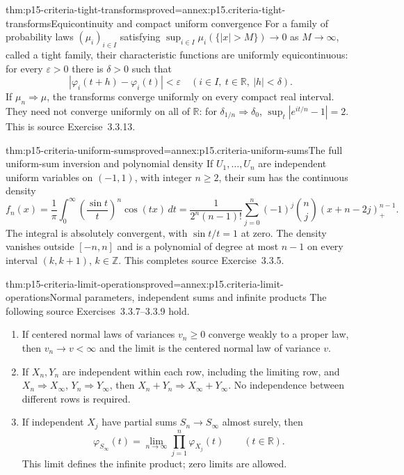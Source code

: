 \begin{hbtheorem}{thm:p15-criteria-tight-transforms}{proved=annex:p15.criteria-tight-transforms}{Equicontinuity and compact uniform convergence}
For a family of probability laws \((\mu_i)_{i\in I}\) satisfying
\(\sup_{i\in I}\mu_i(\{|x|>M\})\to0\) as \(M\to\infty\),
called a tight family,
their characteristic functions are uniformly equicontinuous:
for every \(\varepsilon>0\) there is \(\delta>0\) such that
\[
 |\varphi_i(t+h)-\varphi_i(t)|<\varepsilon
                 \quad(i\in I,\ t\in\mathbb R,\ |h|<\delta).
\]
If \(\mu_n\Rightarrow\mu\), the transforms converge uniformly
on every compact real interval. They need not converge uniformly
on all of \(\mathbb R\): for \(\delta_{1/n}\Rightarrow\delta_0\),
\(\sup_t|e^{it/n}-1|=2\).
This is source Exercise~3.3.13.
\end{hbtheorem}

\begin{hbtheorem}{thm:p15-criteria-uniform-sums}{proved=annex:p15.criteria-uniform-sums}{The full uniform-sum inversion and polynomial density}
If \(U_1,\ldots,U_n\) are independent uniform variables on
\((-1,1)\), with integer \(n\geq2\), their sum has the
continuous density
\[
 f_n(x)=\frac1\pi\int_0^\infty
                  \left(\frac{\sin t}{t}\right)^n\cos(tx)\,dt
 =\frac1{2^n(n-1)!}\sum_{j=0}^n(-1)^j\binom nj
                              (x+n-2j)_+^{n-1}.
\]
The integral is absolutely convergent, with \(\sin t/t=1\)
at zero. The density vanishes outside \([-n,n]\) and is
a polynomial of degree at most \(n-1\) on every interval
\((k,k+1)\), \(k\in\mathbb Z\).
This completes source Exercise~3.3.5.
\end{hbtheorem}

\begin{hbtheorem}{thm:p15-criteria-limit-operations}{proved=annex:p15.criteria-limit-operations}{Normal parameters, independent sums and infinite products}
The following source Exercises~3.3.7--3.3.9 hold.
\begin{enumerate}
\item If centered normal laws of variances \(v_n\geq0\)
converge weakly to a proper law, then \(v_n\to v<\infty\)
and the limit is the centered normal law of variance \(v\).
\item If \(X_n,Y_n\) are independent within each row, including
the limiting row, and \(X_n\Rightarrow X_\infty\),
\(Y_n\Rightarrow Y_\infty\), then
\(X_n+Y_n\Rightarrow X_\infty+Y_\infty\).
No independence between different rows is required.
\item If independent \(X_j\) have partial sums
\(S_n\to S_\infty\) almost surely, then
\[
 \varphi_{S_\infty}(t)=\lim_{n\to\infty}\prod_{j=1}^n\varphi_{X_j}(t)
                                  \qquad(t\in\mathbb R).
\]
This limit defines the infinite product; zero limits are allowed.
\end{enumerate}
\end{hbtheorem}

